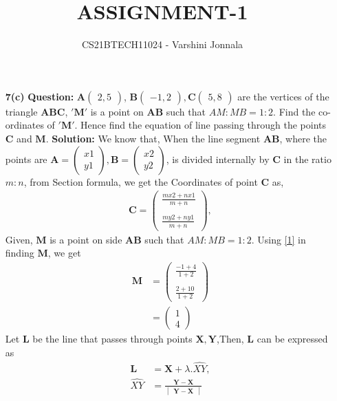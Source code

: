 \documentclass[journal,12pt,twocolumn]{IEEEtran}
\title{ASSIGNMENT-1}
\author{CS21BTECH11024 - Varshini  Jonnala}
\let\vec\mathbf
\newcommand{\question}{\noindent \textbf{Question: }}
\newcommand{\solution}{\noindent \textbf{Solution: }}
\newcommand{\mydet}[1]{\ensuremath{\begin{vmatrix}#1\end{vmatrix}}}
\newcommand{\myvec}[1]{\ensuremath{\begin{pmatrix}#1\end{pmatrix}}}
\begin{document}
\maketitle
\begin{enumerate}
\item[\textbf{7(c)}]\question $\vec{A}\myvec{2,5}$, $\vec{B}\myvec{-1,2}, \vec{C}\myvec{5,8}$ are the vertices of the triangle $\vec{ABC}$, $\vec{'M'}$ is a point on $\vec{AB}$ such that $AM:MB = 1:2$. Find the co-ordinates of $\vec{'M'}$. Hence find the equation of line passing through the points $\vec{C}$ and $\vec{M}$.
\newline \newline
\solution 
We know that, When the line segment $\vec{AB}$, where the points are $\vec{A}=\myvec{x1\\y1}, \vec{B}=\myvec{x2\\y2}$, is divided internally by $\vec{C}$ in the ratio $m:n$, from Section formula,
 we get the Coordinates of point $\vec{C}$ as,
\begin{align} 
\vec{C} = \myvec{\frac{mx2+nx1}{m+n}\\\\ \frac{my2+ny1}{m+n}},\label{1}
\end{align}
Given, $\vec{M}$ is a point on side $\vec{AB}$ such that $AM:MB = 1:2$. 
Using \eqref{1} in finding $\vec{M}$, we get
\begin{align}
    \vec{M} &= \myvec{\frac{-1+4}{1+2}\\\\ \frac{2+10}{1+2}}\\  \label{3}
   &= \myvec{1\\4}
\end{align}\newline
Let $\vec{L}$ be the line that passes through points $\vec{X,Y}$,Then, $\vec{L}$ can be expressed as
\begin{align}
\label{4}
     \vec{L} &= \vec{X} + \lambda.\hat{XY} ,\\
\hat{XY} &= \frac{\vec{Y} - \vec{X}}{\mydet{\vec{Y} - \vec{X}}} \label{5}
\end{align}


\end{enumerate}
\end{document}
